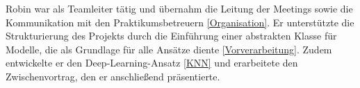 Robin war als Teamleiter tätig und übernahm die Leitung der Meetings sowie die Kommunikation mit den Praktikumsbetreuern {\ref{Organisation}}. Er unterstützte die Strukturierung des Projekts durch die Einführung einer abstrakten Klasse für Modelle, die als Grundlage für alle Ansätze diente {\ref{Vorverarbeitung}}. Zudem entwickelte er den Deep-Learning-Ansatz {\ref{KNN}} und erarbeitete den Zwischenvortrag, den er anschließend präsentierte.